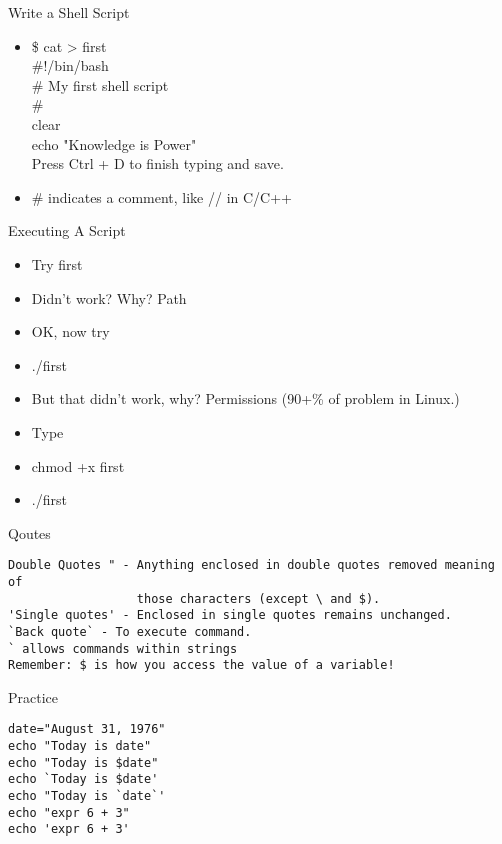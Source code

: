 \documentclass{beamer}
\begin{document}
\begin{frame}{Write a Shell Script}
\begin{itemize}
\item \$ cat > first \\
\#!/bin/bash \\
\# My first shell script \\
\# \\
clear \\
echo "Knowledge is Power" \\
Press Ctrl + D to finish typing and save.
\item \# indicates a comment, like // in C/C++ 
\end{itemize}
\end{frame}

\begin{frame}{Executing A Script}
\begin{itemize}
\item Try first
\item Didn't work? Why? Path
\item OK, now try
\item ./first
\item But that didn't work, why? Permissions (90+\% of problem in Linux.)
\item Type
\item chmod +x first
\item ./first
\end{itemize}
\end{frame}

\begin{frame}[fragile]{Qoutes}
\begin{lstlisting}
Double Quotes " - Anything enclosed in double quotes removed meaning of 
                  those characters (except \ and $).
'Single quotes' - Enclosed in single quotes remains unchanged.
`Back quote` - To execute command.
` allows commands within strings
Remember: $ is how you access the value of a variable!
\end{lstlisting}
\end{frame}

\begin{frame}[fragile]{Practice}
\begin{lstlisting}
date="August 31, 1976"
echo "Today is date"
echo "Today is $date"
echo `Today is $date'
echo "Today is `date`'
echo "expr 6 + 3"
echo 'expr 6 + 3'
\end{lstlisting}
\end{frame}
\end{document}
